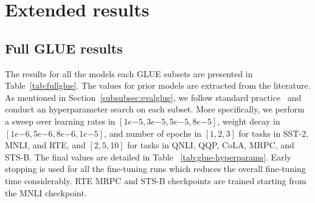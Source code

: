 \documentclass[11pt]{article}
\begin{document}
\section{Extended results}
\label{app:fullresults}
\subsection{Full GLUE results}
\label{subsec:fullglueresults}
The results for all the models each GLUE subsets are presented in Table~\ref{tab:fullglue}. The values for prior models are extracted from the literature. As mentioned in Section~\ref{subsubsec:evalglue}, we follow standard practice~\cite{roberta,mosaic,debertav3} and conduct an hyperparameter search on each subset. More specifically, we perform a sweep over learning rates in $[1e{-5}, 3e{-5}, 5e{-5}, 8e{-5}]$, weight decay in $[1e{-6}, 5e{-6}, 8e{-6}, 1e{-5}]$, and number of epochs in $[1, 2, 3]$ for tasks in SST-2, MNLI, and RTE, and $[2, 5, 10]$ for tasks in QNLI, QQP, CoLA, MRPC, and STS-B. The final values are detailed in Table ~\ref{tab:glue-hyperparams}. Early stopping is used for all the fine-tuning runs which reduces the overall fine-tuning time considerably. RTE MRPC and STS-B checkpoints are trained starting from the MNLI checkpoint.
\end{document}
